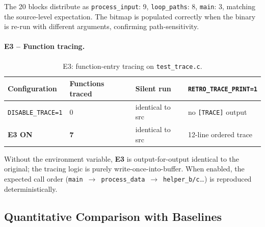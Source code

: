 \documentclass[10pt,a4paper]{article}
\begin{document}
The 20 blocks distribute as \texttt{process\_input}: 9, \texttt{loop\_paths}:
8, \texttt{main}: 3, matching the source-level expectation. The bitmap is
populated correctly when the binary is re-run with different arguments,
confirming path-sensitivity.

\paragraph{E3 -- Function tracing.}

\begin{table}[H]
\centering
\caption{E3: function-entry tracing on \texttt{test\_trace.c}.}
\label{tab:e3}
\footnotesize
\begin{tabular}{p{3.7cm}p{2.4cm}p{2.7cm}p{5.2cm}}
\toprule
\textbf{Configuration} & \textbf{Functions traced} & \textbf{Silent run} & \textbf{\texttt{RETRO\_TRACE\_PRINT=1}} \\
\midrule
\rowcolor{rowgray} \texttt{DISABLE\_TRACE=1} & 0 & identical to src & no \texttt{[TRACE]} output \\
\rowcolor{success!8} \textbf{E3 ON} & \textbf{7} & identical to src & 12-line ordered trace \\
\bottomrule
\end{tabular}
\end{table}

Without the environment variable, \textbf{E3} is
output-for-output identical to the original; the tracing logic is purely
write-once-into-buffer. When enabled, the expected call order
\mbox{(\texttt{main} $\to$ \texttt{process\_data} $\to$
\texttt{helper\_b/c}\ldots)} is reproduced deterministically.

\subsection{Quantitative Comparison with Baselines}
\end{document}
